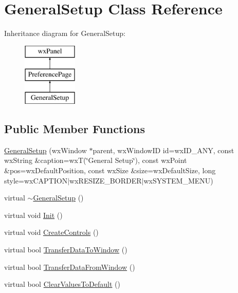 \hypertarget{a00105}{\section{General\-Setup Class Reference}
\label{a00105}
}
Inheritance diagram for General\-Setup\-:\begin{figure}[H]
\begin{center}
\leavevmode
\includegraphics[height=3.000000cm]{a00105}
\end{center}
\end{figure}
\subsection*{Public Member Functions}
\begin{DoxyCompactItemize}
\item 
\hyperlink{a00105_a73afe4e1b6268865896c1f0c7447147b}{General\-Setup} (wx\-Window $\ast$parent, wx\-Window\-I\-D id=wx\-I\-D\-\_\-\-A\-N\-Y, const wx\-String \&caption=wx\-T(\char`\"{}General Setup\char`\"{}), const wx\-Point \&pos=wx\-Default\-Position, const wx\-Size \&size=wx\-Default\-Size, long style=wx\-C\-A\-P\-T\-I\-O\-N$\vert$wx\-R\-E\-S\-I\-Z\-E\-\_\-\-B\-O\-R\-D\-E\-R$\vert$wx\-S\-Y\-S\-T\-E\-M\-\_\-\-M\-E\-N\-U)
\item 
virtual \hyperlink{a00105_a05869c2dde591289f74445b8a54303dd}{$\sim$\-General\-Setup} ()
\item 
virtual void \hyperlink{a00105_a61753dfb823e23684777095b859ebeb1}{Init} ()
\item 
virtual void \hyperlink{a00105_ab4c34cc253e74ffbf379f749d8ebe807}{Create\-Controls} ()
\item 
virtual bool \hyperlink{a00105_acce3f48c883d4c9033a5deaad3606196}{Transfer\-Data\-To\-Window} ()
\item 
virtual bool \hyperlink{a00105_ae769b98b54a2d5ddb53e4e0996a0b451}{Transfer\-Data\-From\-Window} ()
\item 
virtual bool \hyperlink{a00105_afd8ecde62d2607f1fd2802cf0779fa47}{Clear\-Values\-To\-Default} ()
\end{DoxyCompactItemize}
